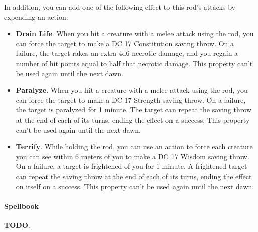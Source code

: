         In addition, you can add one of the following effect to this rod's attacks by expending an action:
        \begin{itemize}
            \item \textbf{Drain Life}.
            When you hit a creature with a melee attack using the rod, you can force the target to make a DC 17 Constitution saving throw.
            On a failure, the target rakes an extra 4d6 necrotic damage, and you regain a number of hit points equal to half that necrotic damage.
            This property can't be used again until the next dawn.
            \item \textbf{Paralyze}.
            When you hit a creature with a melee attack using the rod, you can force the target to make a DC 17 Strength saving throw.
            On a failure, the target is paralyzed for 1 minute.
            The target can repeat the saving throw at the end of each of its turns, ending the effect on a success.
            This property can't be used again until the next dawn.
            \item \textbf{Terrify}.
            While holding the rod, you can use an action to force each creature you can see within 6 meters of you to make a DC 17 Wisdom saving throw.
            On a failure, a target is frightened of you for 1 minute.
            A frightened target can repeat the saving throw at the end of each of its turns, ending the effect on itself on a success.
            This property can't be used again until the next dawn.
        \end{itemize}
    \paragraph{Spellbook} \label{item::spellbook}
        \textbf{TODO}.
\newpage

